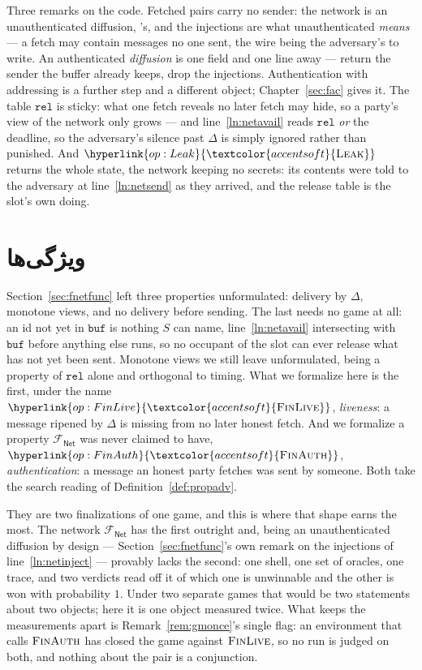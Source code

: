 \documentclass[10pt,oneside,openany]{book}
\newcommand{\op}[1]{\textnormal{\textsc{#1}}}
\newcommand{\opl}[1]{\hyperlink{op:#1}{\textcolor{accentsoft}{\op{#1}}}}
\newcommand{\Fnet}{\mathcal{F}_{\mathsf{Net}}}
\newcommand{\V}[1]{\mathtt{#1}}
\theoremstyle{accentdef}
\theoremstyle{accentplain}
\begin{document}
Three remarks on the code. Fetched pairs carry no sender: the network is an unauthenticated
diffusion, \cite{BMTZ17}'s, and the injections are what unauthenticated \emph{means} --- a fetch
may contain messages no one sent, the wire being the adversary's to write. An authenticated
\emph{diffusion} is one field and one line away --- return the sender the buffer already keeps,
drop the injections. Authentication with addressing is a further step and a different object;
Chapter~\ref{sec:fac} gives it. The table $\V{rel}$ is sticky: what one fetch reveals no later fetch may hide, so a party's view
of the network only grows --- and line~\ref{ln:netavail} reads $\V{rel}$ \emph{or} the deadline,
so the adversary's silence past $\Delta$ is simply ignored rather than punished. And
$\opl{Leak}$ returns the whole state, the network keeping no secrets: its contents were told to
the adversary at line~\ref{ln:netsend} as they arrived, and the release table is the slot's own
doing.

\section{ویژگی‌ها}\label{sec:netprops}

Section~\ref{sec:fnetfunc} left three properties unformulated: delivery by $\Delta$, monotone
views, and no delivery before sending. The last needs no game at all: an id not yet in $\V{buf}$
is nothing $S$ can name, line~\ref{ln:netavail} intersecting with $\V{buf}$ before anything else
runs, so no occupant of the slot can ever release what has not yet been sent. Monotone views we
still leave unformulated, being a property of $\V{rel}$ alone and orthogonal to timing. What we
formalize here is the first, under the name $\opl{FinLive}$, \emph{liveness}: a message ripened
by $\Delta$ is missing from no later honest fetch. And we formalize a property $\Fnet$ was never
claimed to have, $\opl{FinAuth}$, \emph{authentication}: a message an honest party fetches was
sent by someone. Both take the search reading of Definition~\ref{def:propadv}.

They are two finalizations of one game, and this is where that shape earns the most. The network $\Fnet$ has
the first outright and, being an unauthenticated diffusion by design ---
Section~\ref{sec:fnetfunc}'s own remark on the injections of line~\ref{ln:netinject} ---
provably lacks the second: one shell, one set of oracles, one trace, and two verdicts read off it
of which one is unwinnable and the other is won with probability $1$. Under two separate games
that would be two statements about two objects; here it is one object measured twice. What keeps
the measurements apart is Remark~\ref{rem:gmonce}'s single flag: an environment that calls
$\op{FinAuth}$ has closed the game against $\op{FinLive}$, so no run is judged on both, and
nothing about the pair is a conjunction.
\end{document}
